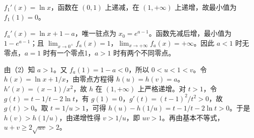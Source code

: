 \begin{Subquestions}
\item {}$f_1'(x)=\ln x$，函数在 $(0,1)$ 上递减，在 $(1,+\infty)$ 上递增，故最小值为 $f_1(1)=0$。
\item {}$f_a'(x)=\ln x+1-a$，唯一驻点为 $x_0=e^{a-1}$。函数先减后增，最小值为 $1-e^{a-1}$；且 $\lim_{x\to0^+}f_a(x)=1$，$\lim_{x\to+\infty}f_a(x)=+\infty$。因此 $a<1$ 时无零点，$a=1$ 时有一个零点1，$a>1$ 时有两个不同零点。
\item {}由（2）知 $a>1$。又 $f_a(1)=1-a<0$，所以 $0<u<1<v$。令 $h(x)=\ln x+1/x$，由零点方程得 $h(u)=h(v)=a$。$h'(x)=(x-1)/x^2$，故 $h$ 在 $(1,+\infty)$ 上严格递增。对 $t>1$，令 $g(t)=t-1/t-2\ln t$，有 $g(1)=0$，$g'(t)=(t-1)^2/t^2>0$，故 $g(t)>0$。取 $t=1/u>1$，可得 $h(u)-h(1/u)=t-1/t-2\ln t>0$。于是 $h(v)>h(1/u)$，由递增性得 $v>1/u$，即 $uv>1$。再由基本不等式，$u+v\geq2\sqrt{uv}>2$。
\end{Subquestions}
